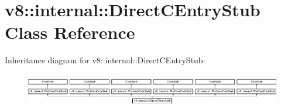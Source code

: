 \hypertarget{classv8_1_1internal_1_1_direct_c_entry_stub}{}\section{v8\+:\+:internal\+:\+:Direct\+C\+Entry\+Stub Class Reference}
\label{classv8_1_1internal_1_1_direct_c_entry_stub}
Inheritance diagram for v8\+:\+:internal\+:\+:Direct\+C\+Entry\+Stub\+:\begin{figure}[H]
\begin{center}
\leavevmode
\includegraphics[height=1.481482cm]{classv8_1_1internal_1_1_direct_c_entry_stub}
\end{center}
\end{figure}
